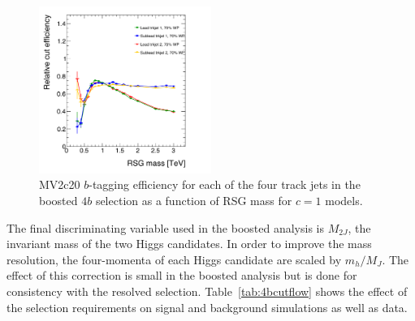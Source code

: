 \begin{figure}[h!]
  \centering
  \captionsetup{justification=centering}

  \includegraphics[width=0.5\textwidth]{figures/Btag_singlejet_comparison}
  \caption{MV2c20 $b$-tagging efficiency for each of the four track jets in the boosted $4b$ selection as a function of RSG mass for $c=1$ models.}
  \label{fig:btag_ind_jet}
\end{figure}

The final discriminating variable used in the boosted analysis is $M_{2J}$, the invariant mass of the two Higgs candidates. In order to improve the mass resolution, the four-momenta of each Higgs candidate are scaled by $m_{h}/M_{J}$. The effect of this correction is small in the boosted analysis but is done for consistency with the resolved selection. Table~\ref{tab:4bcutflow} shows the effect of the selection requirements on signal and background simulations as well as data. 

